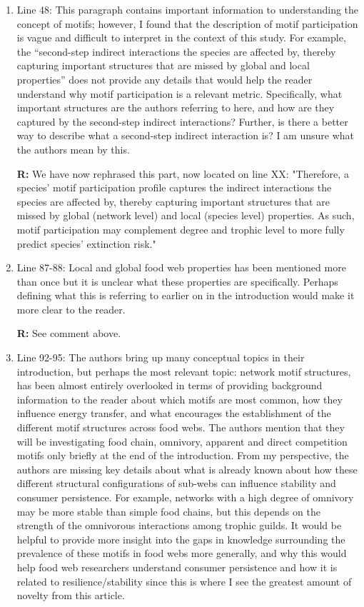 \documentclass[12pt]{article}
\begin{document}
\begin{enumerate}
            \item Line 48: This paragraph contains important information to understanding the concept of motifs; however, I found that the description of motif participation is vague and difficult to interpret in the context of this study. For example, the “second-step indirect interactions the species are affected by, thereby capturing important structures that are missed by global and local properties” does not provide any details that would help the reader understand why motif participation is a relevant metric. Specifically, what important structures are the authors referring to here, and how are they captured by the second-step indirect interactions? Further, is there a better way to describe what a second-step indirect interaction is? I am unsure what the authors mean by this.

                \textbf{R:}
            We have now rephrased this part, now located on line XX: "Therefore, a species' motif participation profile captures the indirect interactions the species are affected by, thereby capturing important structures that are missed by global (network level) and local (species level) properties.  As such, motif participation may complement degree and trophic level to more fully predict species' extinction risk."

            
            \item Line 87-88: Local and global food web properties has been mentioned more than once but it is unclear what these properties are specifically. Perhaps defining what this is referring to earlier on in the introduction would make it more clear to the reader.

                \textbf{R:}
            See comment above. 

            
            \item Line 92-95: The authors bring up many conceptual topics in their introduction, but perhaps the most relevant topic: network motif structures, has been almost entirely overlooked in terms of providing background information to the reader about which motifs are most common, how they influence energy transfer, and what encourages the establishment of the different motif structures across food webs. The authors mention that they will be investigating food chain, omnivory, apparent and direct competition motifs only briefly at the end of the introduction. From my perspective, the authors are missing key details about what is already known about how these different structural configurations of sub-webs can influence stability and consumer persistence. For example, networks with a high degree of omnivory may be more stable than simple food chains, but this depends on the strength of the omnivorous interactions among trophic guilds. It would be helpful to provide more insight into the gaps in knowledge surrounding the prevalence of these motifs in food webs more generally, and why this would help food web researchers understand consumer persistence and how it is related to resilience/stability since this is where I see the greatest amount of novelty from this article.


\end{enumerate}
\end{document}

